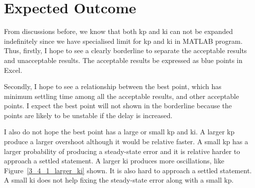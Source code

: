 \section{Expected Outcome} %
\label{section4.2}
From discussions before, we know that both kp and ki can not be expanded indefinitely since we have specialised limit for kp and ki in MATLAB program. Thus, firstly, I hope to see a clearly borderline to separate the acceptable results and unacceptable results. The acceptable results be expressed as blue points in Excel.  

Secondly, I hope to see a relationship between the best point, which has minimum settling time among all the acceptable results, and other acceptable points. I expect the best point will not shown in the borderline because the points are likely to be unstable if the delay is increased.  

I also do not hope the best point has a large or small kp and ki. A larger kp produce a larger overshoot although it would be relative faster. A small kp has a larger probability of producing a steady-state error and it is relative harder to approach a settled statement. A larger ki produces more oscillations, like Figure~\ref{3_4_1_larger_ki} shown. It is also hard to approach a settled statement. A small ki does not help fixing the steady-state error along with a small kp.  